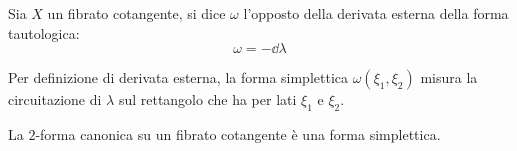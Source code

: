 \begin{definition}
  Sia $X$ un fibrato cotangente, si dice  $\omega$ l'opposto della derivata esterna della forma tautologica: \begin{equation}
  \omega = -\dd{\lambda}
  \end{equation} 
\end{definition}
\begin{remark}
  Per definizione di derivata esterna, la forma simplettica $\omega(\xi_1,\xi_2)$ misura la circuitazione di $\lambda$ sul rettangolo che ha per lati $\xi_1$ e $\xi_2$. 
\end{remark}
\begin{theorem}
  La $2$-forma canonica su un fibrato cotangente è una forma simplettica.
\end{theorem}

